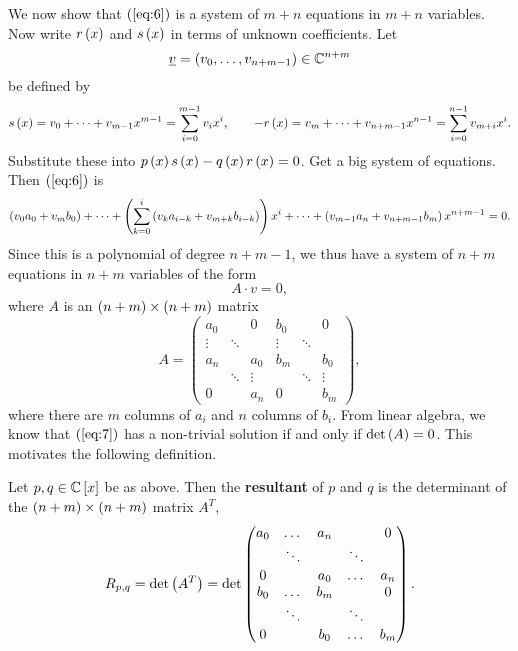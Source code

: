 We now show that $ \left( \ref{eq:6} \right) $ is a system of $ m + n $ equations in $ m + n $ variables. Now write $ r\left( x \right) $ and $ s\left( x \right) $ in terms of unknown coefficients. Let
$$ \underline{v} = \left( v_0, \dots, v_{n + m - 1} \right) \in \mathbb{C}^{n + m} $$
be defined by
$$ s\left( x \right) = v_0 + \dots + v_{m - 1}x^{m - 1} = \sum_{i = 0}^{m - 1} v_ix^i, \qquad -r\left( x \right) = v_m + \dots + v_{n + m - 1}x^{n - 1} = \sum_{i = 0}^{n - 1} v_{m + i}x^i. $$
Substitute these into $ p\left( x \right)s\left( x \right) - q\left( x \right)r\left( x \right) = 0 $. Get a big system of equations. Then $ \left( \ref{eq:6} \right) $ is
$$ \left( v_0a_0 + v_mb_0 \right) + \dots + \left( \sum_{k = 0}^i \left( v_ka_{i - k} + v_{m + k}b_{i - k} \right) \right)x^i + \dots + \left( v_{m - 1}a_n + v_{n + m - 1}b_m \right)x^{n + m - 1} = 0. $$
Since this is a polynomial of degree $ n + m - 1 $, we thus have a system of $ n + m $ equations in $ n + m $ variables of the form
\begin{equation}
\label{eq:7}
A \cdot v = 0,
\end{equation}
where $ A $ is an $ \left( n + m \right) \times \left( n + m \right) $ matrix
$$ A =
\begin{pmatrix}
a_0 & & 0 & b_0 & & 0 \\
\vdots & \ddots & & \vdots & \ddots & \\
a_n & & a_0 & b_m & & b_0 \\
& \ddots & \vdots & & \ddots & \vdots \\
0 & & a_n & 0 & & b_m
\end{pmatrix},
$$
where there are $ m $ columns of $ a_i $ and $ n $ columns of $ b_i $. From linear algebra, we know that $ \left( \ref{eq:7} \right) $ has a non-trivial solution if and only if $ \det\left( A \right) = 0 $. This motivates the following definition.

\begin{definition}
Let $ p, q \in \mathbb{C}\left[ x \right] $ be as above. Then the \textbf{resultant} of $ p $ and $ q $ is the determinant of the $ \left( n + m \right) \times \left( n + m \right) $ matrix $ A^T $,
$$ R_{p, q} = \det\left( A^T \right) = \det
\begin{pmatrix}
a_0 & \dots & a_n & & 0 \\
& \ddots & & \ddots & \\
0 & & a_0 & \dots & a_n \\
b_0 & \dots & b_m & & 0 \\
& \ddots & & \ddots & \\
0 & & b_0 & \dots & b_m
\end{pmatrix}.
$$
\end{definition}

\pagebreak

